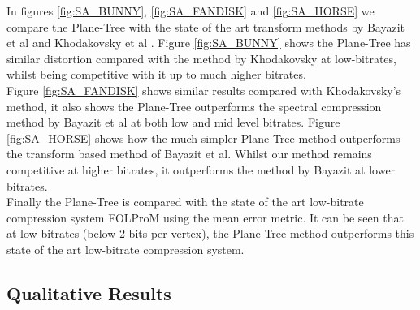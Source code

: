 In figures \ref{fig:SA_BUNNY}, \ref{fig:SA_FANDISK} and \ref{fig:SA_HORSE} we compare the Plane-Tree with the state of the art transform methods by Bayazit et al \cite{Bayazit103DMesh} and Khodakovsky et al \cite{Khodakovsky00Progressive}. Figure \ref{fig:SA_BUNNY} shows the Plane-Tree has similar distortion compared with the method by Khodakovsky at low-bitrates, whilst being competitive with it up to much higher bitrates. \\

Figure \ref{fig:SA_FANDISK} shows similar results compared with Khodakovsky's method, it also shows the Plane-Tree outperforms the spectral compression method by Bayazit et al at both low and mid level bitrates. Figure \ref{fig:SA_HORSE} shows how the much simpler Plane-Tree method outperforms the transform based method of Bayazit et al. Whilst our method remains competitive at higher bitrates, it outperforms the method by Bayazit at lower bitrates. \\

Finally the Plane-Tree is compared with the state of the art low-bitrate compression system FOLProM \cite{Peng10Feature} using the mean error metric. It can be seen that at low-bitrates (below 2 bits per vertex), the Plane-Tree method outperforms this state of the art low-bitrate compression system. \\

\subsection{Qualitative Results}



